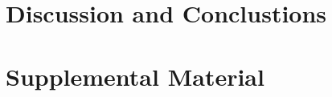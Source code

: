 \documentclass[a4paper, 12pt]{article}
\begin{document}




\section{Discussion and Conclustions}


\section{Supplemental Material}

\newpage

{\small
 }
 
\end{document}
